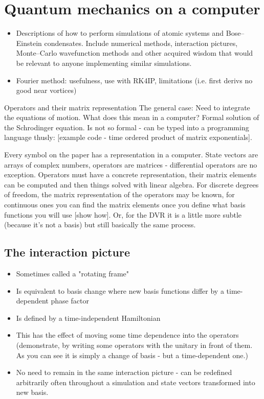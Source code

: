 \chapter{Quantum mechanics on a computer}
\begin{itemize}
\item Descriptions of how to perform simulations of atomic systems and Bose–Einstein condensates. Include numerical methods, interaction pictures, Monte–Carlo wavefunction methods and other acquired wisdom that would be relevant to anyone implementing similar simulations.

\item Fourier method: usefulness, use with RK4IP, limitations (i.e. first derivs no good near vortices)


\end{itemize}


    Operators and their matrix representation
    The general case: Need to integrate the equations of motion. What does this mean in a computer? Formal solution of the Schrodinger equation. Is not so formal - can be typed into a programming language thusly: [example code - time ordered product of matrix exponentials].

    Every symbol on the paper has a representation in a computer. State vectors are arrays of complex numbers, operators are matrices - differential operators are no exception. Operators must have a concrete representation, their matrix elements can be computed and then things solved with linear algebra. For discrete degrees of freedom, the matrix representation of the operators may be known, for continuous ones you can find the matrix elements once you define what basis functions you will use [show how]. Or, for the DVR it is a little more subtle (because it's not a basis) but still basically the same process.

\section{The interaction picture}
    \begin{itemize}
        \item Sometimes called a "rotating frame"
        \item Is equivalent to basis change where new basis functions differ by a time-dependent phase factor
        \item Is defined by a time-independent Hamiltonian
        \item This has the effect of moving some time dependence into the operators (demonstrate, by writing some operators with the unitary in front of them. As you can see it is simply a change of basis - but a time-dependent one.)
        \item No need to remain in the same interaction picture - can be redefined arbitrarily often throughout a simulation and state vectors transformed into new basis.
    \end{itemize}

